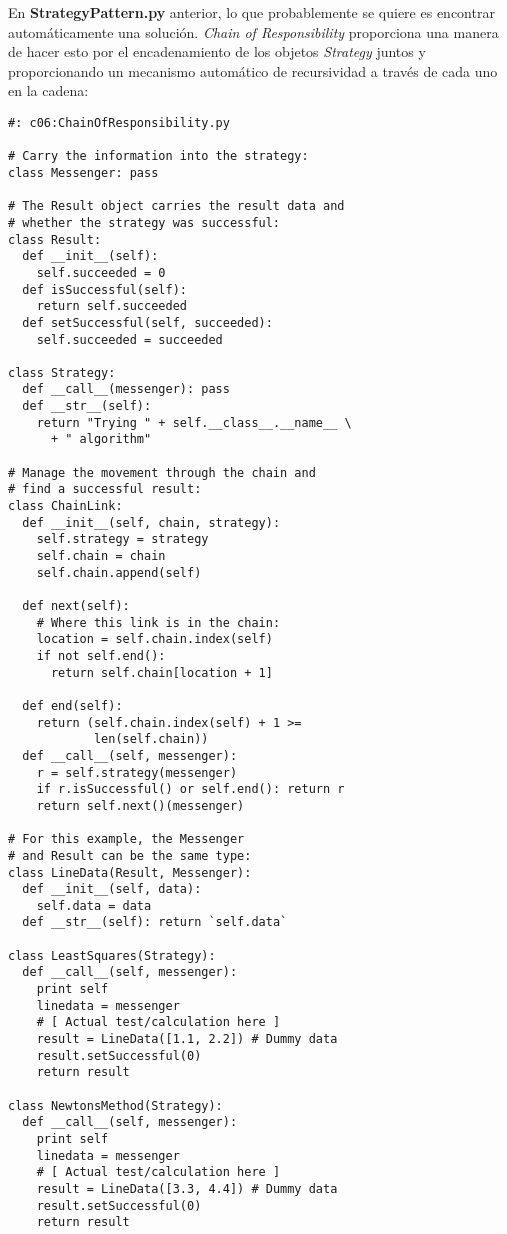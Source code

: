 
En \textbf{StrategyPattern.py} anterior, lo que probablemente se quiere es encontrar automáticamente una solución. \textit{Chain of Responsibility} proporciona una manera de hacer esto por el encadenamiento de los objetos \textit{Strategy} juntos y proporcionando un mecanismo automático de recursividad a través de cada uno en la cadena:     \newline

\begin{lstlisting} 
#: c06:ChainOfResponsibility.py 

# Carry the information into the strategy: 
class Messenger: pass 

# The Result object carries the result data and 
# whether the strategy was successful: 
class Result: 
  def __init__(self): 
    self.succeeded = 0 
  def isSuccessful(self):  
    return self.succeeded  
  def setSuccessful(self, succeeded):  
    self.succeeded = succeeded 
    
class Strategy: 
  def __call__(messenger): pass 
  def __str__(self):  
    return "Trying " + self.__class__.__name__ \ 
      + " algorithm" 
      
# Manage the movement through the chain and 
# find a successful result: 
class ChainLink: 
  def __init__(self, chain, strategy): 
    self.strategy = strategy 
    self.chain = chain 
    self.chain.append(self) 
    
  def next(self): 
    # Where this link is in the chain: 
    location = self.chain.index(self) 
    if not self.end(): 
      return self.chain[location + 1] 
      
  def end(self): 
    return (self.chain.index(self) + 1 >=  
            len(self.chain)) 
  def __call__(self, messenger): 
    r = self.strategy(messenger) 
    if r.isSuccessful() or self.end(): return r 
    return self.next()(messenger) 
    
# For this example, the Messenger 
# and Result can be the same type: 
class LineData(Result, Messenger): 
  def __init__(self, data): 
    self.data = data 
  def __str__(self): return `self.data` 
  
class LeastSquares(Strategy):   
  def __call__(self, messenger): 
    print self 
    linedata = messenger 
    # [ Actual test/calculation here ] 
    result = LineData([1.1, 2.2]) # Dummy data 
    result.setSuccessful(0) 
    return result 
    
class NewtonsMethod(Strategy): 
  def __call__(self, messenger): 
    print self 
    linedata = messenger 
    # [ Actual test/calculation here ] 
    result = LineData([3.3, 4.4]) # Dummy data 
    result.setSuccessful(0) 
    return result 
    

\end{lstlisting}
